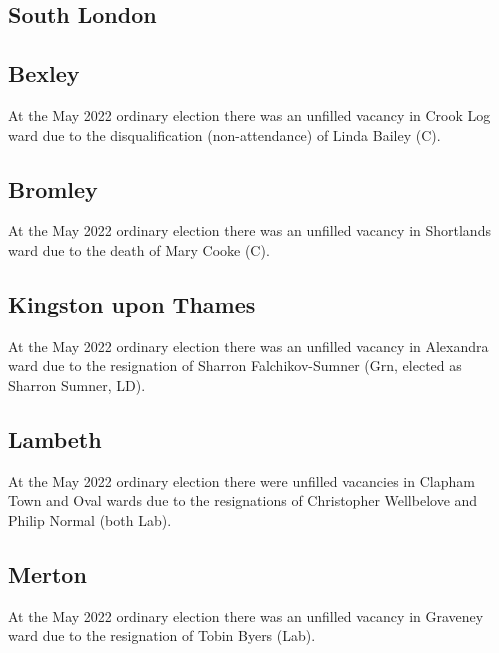 \documentclass[a4paper,openany]{book}
\begin{document}
\begin{resultsiii}
\section{South London}

\subsection*{Bexley}

At the May 2022 ordinary election there was an unfilled vacancy in Crook Log ward due to the disqualification (non-attendance) of Linda Bailey (C).%

\subsection*{Bromley}

At the May 2022 ordinary election there was an unfilled vacancy in Shortlands ward due to the death of Mary Cooke (C).%

\subsection*{Kingston upon Thames}

At the May 2022 ordinary election there was an unfilled vacancy in Alexandra ward due to the resignation of Sharron Falchikov-Sumner (Grn, elected as Sharron Sumner, LD).%

\subsection*{Lambeth}

At the May 2022 ordinary election there were unfilled vacancies in Clapham Town and Oval wards due to the resignations of Christopher Wellbelove and Philip Normal (both Lab).%

\subsection*{Merton}

At the May 2022 ordinary election there was an unfilled vacancy in Graveney ward due to the resignation of Tobin Byers (Lab).%


\end{resultsiii}
\end{document}
